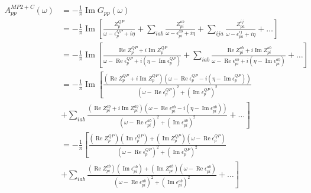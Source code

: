 \begin{align}
A_{pp}^{MP2+C}(\omega) & = -\frac{1}{\pi} \operatorname{Im} G_{pp}(\omega) \\
& = -\frac{1}{\pi} \operatorname{Im}\left[\frac{Z_p^{QP}}{\omega - \epsilon_p^{QP} + i\eta} + \sum_{i a b} \frac{Z_{pi}^{ab}}{\omega - \epsilon_{pi}^{ab} + i\eta} + \sum_{i j a} \frac{Z_{pa}^{ij}}{\omega - \epsilon_{pa}^{ij} + i\eta} + \ldots \right] \\
&= -\frac{1}{\pi} \operatorname{Im}\left[\frac{\operatorname{Re} Z_p^{QP} + i \operatorname{Im} Z_p^{QP}}{\omega - \operatorname{Re} \epsilon_p^{QP} + i\left(\eta - \operatorname{Im} \epsilon_p^{QP}\right)} + \sum_{i a b} \frac{\operatorname{Re} Z_{pi}^{ab} + i \operatorname{Im} Z_{pi}^{ab}}{\omega - \operatorname{Re} \epsilon_{pi}^{ab} + i\left(\eta - \operatorname{Im} \epsilon_{pi}^{ab}\right)} + \ldots \right] \\
&= -\frac{1}{\pi} \operatorname{Im}\left[\frac{\left(\operatorname{Re} Z_p^{QP} + i \operatorname{Im} Z_p^{QP}\right)\left(\omega - \operatorname{Re} \epsilon_p^{QP} - i\left(\eta - \operatorname{Im} \epsilon_p^{QP}\right)\right)}{\left(\omega - \operatorname{Re} \epsilon_p^{QP}\right)^2 + \left(\operatorname{Im} \epsilon_p^{QP}\right)^2}\right.\\
& \left. + \sum_{i a b} \frac{\left(\operatorname{Re} Z_{pi}^{ab} + i \operatorname{Im} Z_{pi}^{ab}\right)\left(\omega - \operatorname{Re} \epsilon_{pi}^{ab} - i\left(\eta - \operatorname{Im} \epsilon_{pi}^{ab}\right)\right)}{\left(\omega - \operatorname{Re} \epsilon_{pi}^{ab}\right)^2 + \left(\operatorname{Im} \epsilon_{pi}^{ab}\right)^2} + \ldots \right] \\
&= -\frac{1}{\pi}\left[\frac{\left(\operatorname{Re} Z_p^{QP}\right)\left(\operatorname{Im} \epsilon_p^{QP}\right) + \left(\operatorname{Im} Z_p^{QP}\right)\left(\omega - \operatorname{Re} \epsilon_p^{QP}\right)}{\left(\omega - \operatorname{Re} \epsilon_p^{QP}\right)^2 + \left(\operatorname{Im} \epsilon_p^{QP}\right)^2}\right.\\
& \left. + \sum_{i a b} \frac{\left(\operatorname{Re} Z_{pi}^{ab}\right)\left(\operatorname{Im} \epsilon_{pi}^{ab}\right) + \left(\operatorname{Im} Z_{pi}^{ab}\right)\left(\omega - \operatorname{Re} \epsilon_{pi}^{ab}\right)}{\left(\omega - \operatorname{Re} \epsilon_{pi}^{ab}\right)^2 + \left(\operatorname{Im} \epsilon_{pi}^{ab}\right)^2} + \ldots \right] 

\end{align}
